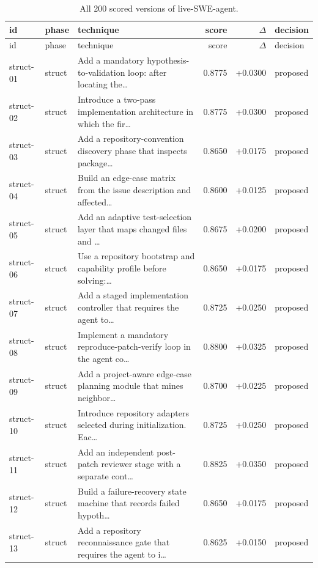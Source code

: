 \begin{center}\scriptsize\begin{longtable}{llp{5.2cm}rrl}
\caption{All 200 scored versions of live-SWE-agent.}\\
\toprule id & phase & technique & score & $\Delta$ & decision \\ \midrule \endfirsthead
\toprule id & phase & technique & score & $\Delta$ & decision \\ \midrule \endhead
struct-01 & struct & Add a mandatory hypothesis-to-validation loop: after locating the\ldots{} & 0.8775 & +0.0300 & proposed \\
struct-02 & struct & Introduce a two-pass implementation architecture in which the fir\ldots{} & 0.8775 & +0.0300 & proposed \\
struct-03 & struct & Add a repository-convention discovery phase that inspects package\ldots{} & 0.8650 & +0.0175 & proposed \\
struct-04 & struct & Build an edge-case matrix from the issue description and affected\ldots{} & 0.8600 & +0.0125 & proposed \\
struct-05 & struct & Add an adaptive test-selection layer that maps changed files and \ldots{} & 0.8675 & +0.0200 & proposed \\
struct-06 & struct & Use a repository bootstrap and capability profile before solving:\ldots{} & 0.8650 & +0.0175 & proposed \\
struct-07 & struct & Add a staged implementation controller that requires the agent to\ldots{} & 0.8725 & +0.0250 & proposed \\
struct-08 & struct & Implement a mandatory reproduce-patch-verify loop in the agent co\ldots{} & 0.8800 & +0.0325 & proposed \\
struct-09 & struct & Add a project-aware edge-case planning module that mines neighbor\ldots{} & 0.8700 & +0.0225 & proposed \\
struct-10 & struct & Introduce repository adapters selected during initialization. Eac\ldots{} & 0.8725 & +0.0250 & proposed \\
struct-11 & struct & Add an independent post-patch reviewer stage with a separate cont\ldots{} & 0.8825 & +0.0350 & proposed \\
struct-12 & struct & Build a failure-recovery state machine that records failed hypoth\ldots{} & 0.8650 & +0.0175 & proposed \\
struct-13 & struct & Add a repository reconnaissance gate that requires the agent to i\ldots{} & 0.8625 & +0.0150 & proposed \\

\end{longtable}
\end{center}
